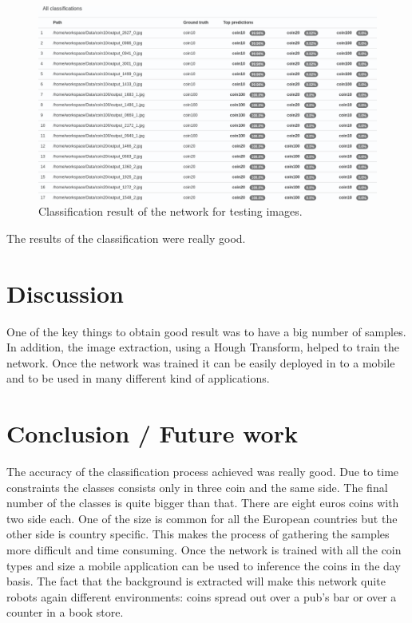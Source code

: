 \documentclass[10pt,journal,compsoc]{IEEEtran}
\begin{document}
\begin{figure}[h]
\centering
\includegraphics[scale=0.2]{classification-all}
\caption{Classification result of the network for testing images.}
\label{fig:figure5}
\end{figure}

The results of the classification were really good. 

\section{Discussion}

One of the key things to obtain good result was to have a big number of samples. In addition, the image extraction, using a Hough Transform, helped to train the network. Once the network was trained it can be easily deployed in to a mobile and to be used in many different kind of applications.

	
\section{Conclusion / Future work}

The accuracy of the classification process achieved was really good. Due to time constraints the classes consists only in three coin and the same side. The final number of the classes is quite bigger than that. There are eight euros coins with two side each. One of the size is common for all the European countries but the other side is country specific. This makes the process of gathering the samples more difficult and time consuming. Once the network is trained with all the coin types and size a mobile application can be used to inference the coins in the day basis. The fact that the background is extracted will make this network quite robots again different environments: coins spread out over a pub's bar or over a counter in a book store.

		


		
\end{document}
